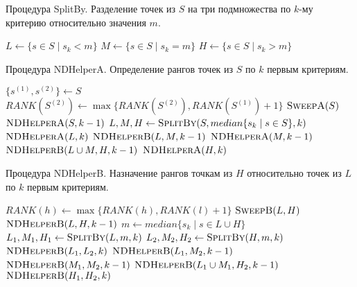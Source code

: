 \begin{algorithm}[!h]
\caption{Процедура SplitBy. Разделение точек из $S$ на три подмножества по $k$-му критерию относительно значения $m$.}\label{lst0}
\begin{algorithmic}
    \State $L \gets \{s \in S\mid s_k < m\}$
    \State $M \gets \{s \in S\mid s_k = m\}$
    \State $H \gets \{s \in S\mid s_k > m\}$
\EndProcedure
\end{algorithmic}
\end{algorithm}

\begin{algorithm}[!h]
\caption{Процедура NDHelperA. Определение рангов точек из $S$ по $k$ первым критериям.}\label{lst1}
\begin{algorithmic}
        \State \Return
        \State $\{s^{(1)}, s^{(2)}\}\gets S$
            \State $RANK(S^{(2)})\gets \max\{RANK(S^{(2)}), RANK(S^{(1)})+1\}$ 
        \EndIf
        \State$\textsc{SweepA}(S)$
        \State $\textsc{NDHelperA}(S, k-1)$
    \Else
        \State $L,M,H \gets \textsc{SplitBy}(S, median\{s_k\mid s \in S\}, k)$
        \State $\textsc{NDHelperA}(L, k)$
        \State $\textsc{NDHelperB}(L, M, k-1)$
        \State $\textsc{NDHelperA}(M, k-1)$
        \State $\textsc{NDHelperB}(L \cup M, H, k-1)$
        \State $\textsc{NDHelperA}(H, k)$
    \EndIf
\EndProcedure
\end{algorithmic}
\end{algorithm}

\begin{algorithm}[!h]
\caption{Процедура NDHelperB. Назначение рангов точкам из $H$ относительно точек из $L$ по $k$ первым критериям.}\label{lst2}
\begin{algorithmic}
        \State \Return
                \State $RANK(h) \gets \max\{RANK(h), RANK(l) + 1\}$
            \EndIf
        \EndFor
        \State $\textsc{SweepB}(L, H)$
        \State $\textsc{NDHelperB}(L, H, k-1)$
    \Else
        \State $m \gets median\{s_k\mid s \in L \cup H\}$
        \State $L_1, M_1, H_1 \gets \textsc{SplitBy}(L, m, k)$
        \State $L_2, M_2, H_2 \gets \textsc{SplitBy}(H, m, k)$
        \State $\textsc{NDHelperB}(L_1, L_2, k)$
        \State $\textsc{NDHelperB}(L_1, M_2, k-1)$
        \State $\textsc{NDHelperB}(M_1, M_2, k-1)$
        \State $\textsc{NDHelperB}(L_1 \cup M_1, H_2, k-1)$
        \State $\textsc{NDHelperB}(H_1, H_2, k)$
    \EndIf
\EndProcedure
\end{algorithmic}
\end{algorithm}
